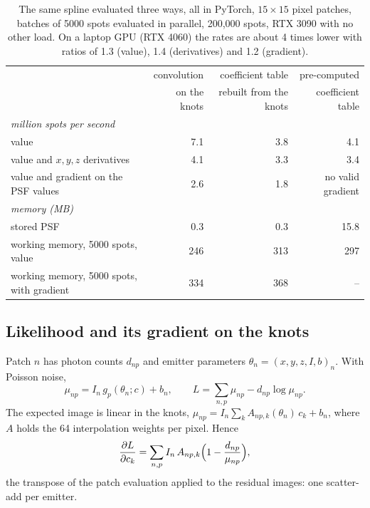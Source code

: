 \documentclass[11pt,a4paper]{article}
\begin{document}
\begin{table}[t]\centering\small
\begin{tabular}{lrrr}\toprule
 & convolution & coefficient table & pre-computed\\
 & on the knots & rebuilt from the knots & coefficient table\\ \midrule
\multicolumn{4}{l}{\emph{million spots per second}}\\
value & 7.1 & 3.8 & 4.1\\
value and $x,y,z$ derivatives & 4.1 & 3.3 & 3.4\\
value and gradient on the PSF values & 2.6 & 1.8 & no valid gradient\\
\multicolumn{4}{l}{\emph{memory (MB)}}\\
stored PSF & 0.3 & 0.3 & 15.8\\
working memory, 5000 spots, value & 246 & 313 & 297\\
working memory, 5000 spots, with gradient & 334 & 368 & --\\ \bottomrule
\end{tabular}
\caption{The same spline evaluated three ways, all in PyTorch, $15\times15$ pixel patches, batches of 5000
spots evaluated in parallel, 200{,}000 spots, RTX 3090 with no other load. On a laptop GPU (RTX 4060) the
rates are about 4 times lower with ratios of 1.3 (value), 1.4 (derivatives) and 1.2 (gradient).}\label{tab:conv}
\end{table}

\subsection{Likelihood and its gradient on the knots}

Patch $n$ has photon counts $d_{np}$ and emitter parameters $\theta_n=(x,y,z,I,b)_n$. With Poisson noise,
\begin{equation}
\mu_{np}=I_n\,g_p(\theta_n;c)+b_n,\qquad L=\sum_{n,p}\mu_{np}-d_{np}\log\mu_{np}.
\end{equation}
The expected image is linear in the knots, $\mu_{np}=I_n\sum_k A_{np,k}(\theta_n)\,c_k+b_n$, where $A$ holds the
64 interpolation weights per pixel. Hence
\begin{equation}
\frac{\partial L}{\partial c_k}=\sum_{n,p}I_n\,A_{np,k}\Bigl(1-\frac{d_{np}}{\mu_{np}}\Bigr),
\label{eq:knotgrad}
\end{equation}
the transpose of the patch evaluation applied to the residual images: one scatter-add per emitter.
\end{document}
